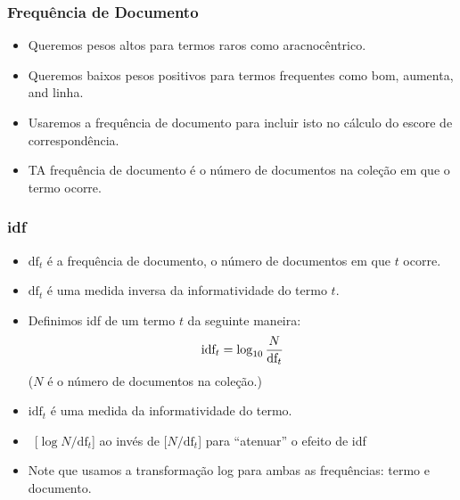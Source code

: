\documentclass[compress]{beamer}
\def\myblue#1{\textcolor{texblue}{#1}}
\def\term#1{{\sc #1}}   %
\begin{document}
\begin{frame}
\frametitle{Frequência de Documento}
\begin{itemize}
\item  Queremos \myblue{pesos altos para termos raros} como \term{aracnocêntrico}.
\item  Queremos \myblue{baixos pesos positivos para termos frequentes} como
\term{bom}, \term{aumenta}, and \term{linha}.
\pause[2]
\item Usaremos a \myblue{frequência de documento} para incluir isto no cálculo do escore de correspondência.
\pause[3]
\item TA frequência de documento é \myblue{o número de documentos na coleção em que o termo  ocorre}.
\end{itemize}
\end{frame}

\begin{frame}[<+->]
\frametitle{\textbf{idf}}
\pause[2]
\begin{itemize}
\item     $\mbox{df}_t$ é a frequência de documento, o número de documentos em que $t$ ocorre.
\item \myblue{$\mbox{df}_t$} é uma medida inversa da \myblue{informatividade} do termo $t$.
\item Definimos \myblue{idf} de um termo $t$ da seguinte maneira:
\begin{equation}\label{eqn:idf}
    \mbox{idf}_t = \log_{10} {N\over \mbox{df}_t} \nonumber
\end{equation}
($N$ é o número de documentos na coleção.)
\item \myblue{$\mbox{idf}_t$} é uma medida da \myblue{informatividade} do termo.
\item \ [$\log {N/\mbox{df}_t}$] ao invés de
  [$N/\mbox{df}_t$] para ``atenuar'' o efeito de idf
\item Note que usamos a transformação log para ambas as frequências: termo e documento.
\end{itemize}
\end{frame}
\end{document}
